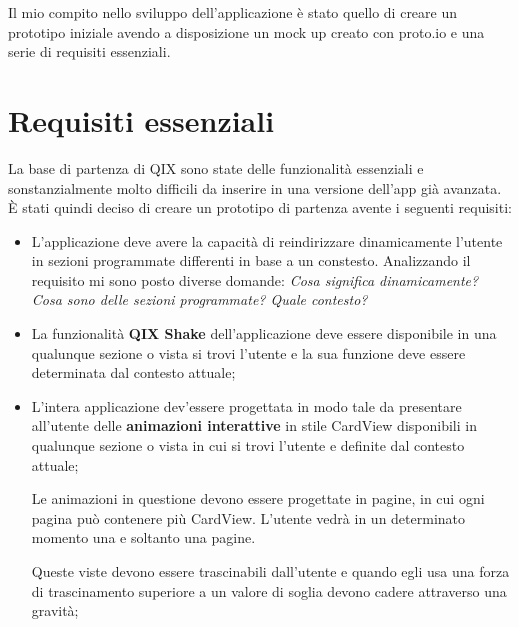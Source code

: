 
Il mio compito nello sviluppo dell'applicazione è stato quello 
di creare un prototipo iniziale avendo a disposizione un mock up creato con
proto.io\cite{protoio} e una serie di requisiti essenziali.

\section{Requisiti essenziali}

La base di partenza di QIX sono state delle funzionalità essenziali e 
sonstanzialmente molto difficili da inserire in una versione dell'app già avanzata.
È stati quindi deciso di creare un prototipo di partenza avente i seguenti requisiti:

\begin{itemize}
    \item {
        L'applicazione deve avere la capacità di reindirizzare 
        dinamicamente l'utente in sezioni programmate differenti in base a un constesto.
        Analizzando il requisito mi sono posto diverse domande:
        \textit{
            Cosa significa dinamicamente?
            Cosa sono delle sezioni programmate?
            Quale contesto?
        }
    }
    \item {
        La funzionalità \textbf{QIX Shake} dell'applicazione
        deve essere disponibile in una qualunque sezione o vista si trovi l'utente
        e la sua funzione deve essere determinata dal contesto attuale;
    } 
    \item {
        L'intera applicazione dev'essere progettata in modo tale da presentare all'utente
        delle \textbf{animazioni interattive} in stile CardView\cite{cardview} disponibili in 
        qualunque sezione o vista in cui si trovi l'utente e definite dal contesto attuale;

        Le animazioni in questione devono essere progettate in pagine, in cui ogni pagina può contenere 
        più CardView. L'utente vedrà in un determinato momento una e soltanto una pagine.

        Queste viste devono essere trascinabili dall'utente e quando egli usa una forza
        di trascinamento superiore a un valore di soglia devono cadere attraverso una gravità;
        
}
\end{itemize}
